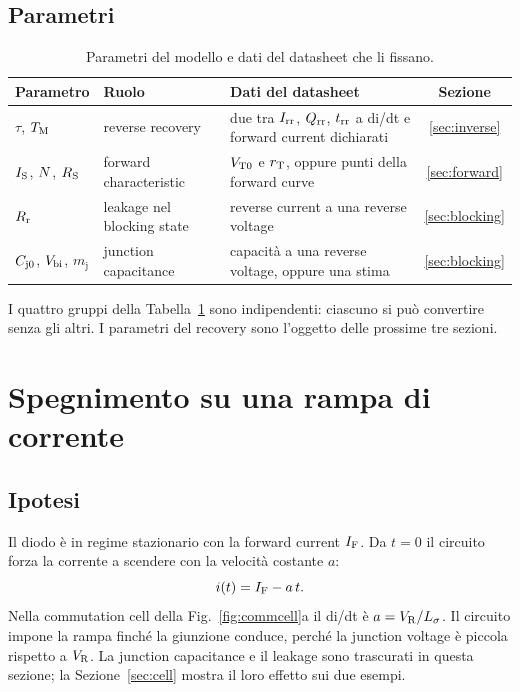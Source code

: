\documentclass[10pt,a4paper]{scrartcl}
\let\newcommand\pdvaluedefine
\newcommand{\IF}{I_\mathrm{F}}
\newcommand{\VR}{V_\mathrm{R}}
\newcommand{\Irr}{I_\mathrm{rr}}
\newcommand{\Qrr}{Q_\mathrm{rr}}
\newcommand{\trr}{t_\mathrm{rr}}
\newcommand{\TM}{T_\mathrm{M}}
\newcommand{\IS}{I_\mathrm{S}}
\newcommand{\RS}{R_\mathrm{S}}
\newcommand{\Rr}{R_\mathrm{r}}
\newcommand{\VTo}{V_\mathrm{T0}}
\newcommand{\rT}{r_\mathrm{T}}
\newcommand{\Cjo}{C_\mathrm{j0}}
\newcommand{\Nem}{N}                          %
\newcommand{\Ls}{L_\sigma}                    %
\newcommand{\Vbi}{V_\mathrm{bi}}
\begin{document}
\subsection{Parametri}
\begin{table}[htb]
\centering\small
\caption{Parametri del modello e dati del datasheet che li fissano.}
\label{tab:params}
\begin{tabular}{@{}llp{6.4cm}c@{}}
\toprule
Parametro & Ruolo & Dati del datasheet & Sezione \\
\midrule
$\tau$, $\TM$ & reverse recovery & due tra $\Irr$, $\Qrr$, $\trr$ a di/dt e forward current dichiarati & \ref{sec:inverse} \\
$\IS$, $\Nem$, $\RS$ & forward characteristic & $\VTo$ e $\rT$, oppure punti della forward curve & \ref{sec:forward} \\
$\Rr$ & leakage nel blocking state & reverse current a una reverse voltage & \ref{sec:blocking} \\
$\Cjo$, $\Vbi$, $m_\mathrm{j}$ & junction capacitance & capacità a una reverse voltage, oppure una stima & \ref{sec:blocking} \\
\bottomrule
\end{tabular}
\end{table}
I quattro gruppi della Tabella~\ref{tab:params} sono indipendenti: ciascuno si può convertire senza gli altri. I parametri del recovery sono l'oggetto delle prossime tre sezioni.

\section{Spegnimento su una rampa di corrente}
\label{sec:ramp}
\subsection{Ipotesi}
Il diodo è in regime stazionario con la forward current $\IF$. Da $t = 0$ il circuito forza la corrente a scendere con la velocità costante $a$:
\begin{equation}
i(t) = \IF - a\,t .
\label{eq:ramp}
\end{equation}
Nella commutation cell della Fig.~\ref{fig:commcell}a il di/dt è $a = \VR/\Ls$. Il circuito impone la rampa finché la giunzione conduce, perché la junction voltage è piccola rispetto a $\VR$. La junction capacitance e il leakage sono trascurati in questa sezione; la Sezione~\ref{sec:cell} mostra il loro effetto sui due esempi.
\end{document}
